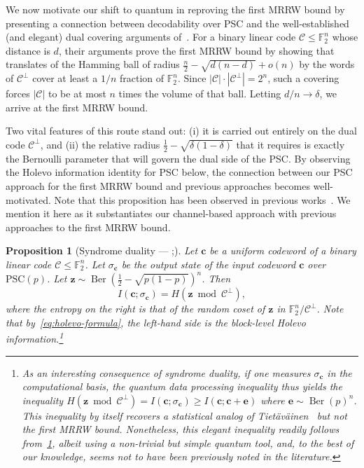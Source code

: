 \documentclass[11pt]{article}
\renewcommand{\leq}{\leqslant}
\renewcommand{\geq}{\geqslant}
\newtheorem{prop}[prop]{Proposition}
\theoremstyle{remark}
\newcommand{\cC}{\mathcal{C}}
\newcommand{\F}{\mathbb{F}}
\newcommand{\Ber}{\operatorname{Ber}}
\newcommand{\bc}{\mathbf{c}}
\newcommand{\be}{\mathbf{e}}
\newcommand{\abs}[1]{\left|#1\right|}
\newcommand{\PSC}{\mathrm{PSC}}
\begin{document}
We now motivate our shift to quantum in reproving the first MRRW bound by presenting a connection between decodability over PSC and the well-established (and elegant) dual covering arguments of~\cite{FT05,NS09}. For a binary linear code $\cC \leq \F_2^n$ whose distance is $d$, their arguments prove the first MRRW bound by showing that translates of the Hamming ball of radius $\frac{n}{2}-\sqrt{d(n-d)}+o(n)$ by the words of $\cC^\perp$ cover at least a $1/n$ fraction of $\F_2^n$. Since $\abs{\cC} \cdot \abs{\cC^\perp} = 2^n$, such a covering forces $\abs{\cC}$ to be at most $n$ times the volume of that ball. Letting $d/n \to \delta$, we arrive at the first MRRW bound.
 
Two vital features of this route stand out: (i) it is carried out entirely on the dual code $\cC^\perp$, and (ii) the relative radius $\frac{1}{2}-\sqrt{\delta(1-\delta)}$ that it requires is exactly the Bernoulli parameter that will govern the dual side of the PSC. By observing the Holevo information identity for PSC below, the connection between our PSC approach for the first MRRW bound and previous approaches becomes well-motivated. Note that this proposition has been observed in previous works~\cite{Ren18,RP21,CT24,BCT26}. We mention it here as it substantiates our channel-based approach with previous approaches to the first MRRW bound.

\begin{prop}[{Syndrome duality --- \cite[Proposition 4]{BCT26};\cite[Lemma 16]{RP21}}]
\label{prop:syndrome-duality}
Let $\bc$ be a uniform codeword of a binary linear code $\cC \leq \F_2^n$. Let $\sigma_{\bc}$ be the output state of the input codeword $\bc$ over $\PSC(p)$. Let $\mathbf{z} \sim \Ber(\frac{1}{2}-\sqrt{p(1-p)})^n$. Then
\begin{equation}
\label{eq:psc-linear-mutual-information}
I(\bc;\sigma_{\bc}) = H\left(\mathbf{z} \bmod{\cC^\perp}\right),
\end{equation}
where the entropy on the right is that of the random coset of $\mathbf{z}$ in $\F_2^n/\cC^\perp$. Note that by~\eqref{eq:holevo-formula}, the left-hand side is the block-level Holevo information.\footnote{As an interesting consequence of syndrome duality, if one measures $\sigma_{\bc}$ in the computational basis, the quantum data processing inequality thus yields the inequality $H(\mathbf{z} \bmod{\cC^\perp}) = I(\bc;\sigma_{\bc}) \geq I(\bc;\bc+\be)$ where $\be \sim \Ber(p)^n$. This inequality by itself recovers a statistical analog of Tiet\"av\"ainen~\cite{Tie90} but not the first MRRW bound. Nonetheless, this elegant inequality readily follows from~\cref{prop:syndrome-duality}, albeit using a non-trivial but simple quantum tool, and, to the best of our knowledge, seems not to have been previously noted in the literature.} 
\end{prop}
\end{document}
